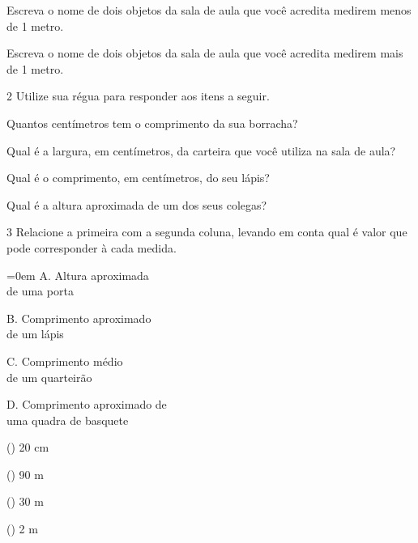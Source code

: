 \begin{escolha}
\item Escreva o nome de dois objetos da sala de aula que você acredita
  medirem menos de 1 metro.

\item Escreva o nome de dois objetos da sala de aula que você acredita
  medirem mais de 1 metro.
\end{escolha}

\num{2} Utilize sua régua para responder aos itens a seguir.

\begin{escolha}
\item Quantos centímetros tem o comprimento da sua borracha?

\item Qual é a largura, em centímetros, da carteira que você utiliza na sala de aula?

\item Qual é o comprimento, em centímetros, do seu lápis?

\item Qual é a altura aproximada de um dos seus colegas?
\end{escolha}

\num{3} Relacione a primeira com a segunda coluna, levando em conta qual é valor que 
pode corresponder à cada medida.


\begin{multicols}{2}\parindent=0em
A. Altura aproximada\\
de uma porta\bigskip

B. Comprimento aproximado\\
de um lápis\bigskip

C. Comprimento médio\\
de um quarteirão\bigskip

D. Comprimento aproximado de\\
uma quadra de basquete

\columnbreak

(\hspace{2em}) 20 cm\bigskip

(\hspace{2em}) 90 m\bigskip

(\hspace{2em}) 30 m\bigskip

(\hspace{2em}) 2 m
\end{multicols}


